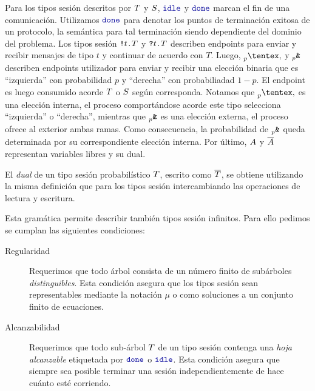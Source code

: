 Para los tipos sesión descritos por $T$ y $S$, $\Idle$
y $\Done$ marcan el fin de una comunicación. Utilizamos $\Done$ para denotar
los puntos de terminación exitosa de un protocolo, la semántica para tal
terminación siendo dependiente del dominio del problema. Los tipos sesión
${\texttt{\upshape!}}{t}\texttt{\upshape.}T$ y ${\texttt{\upshape?}}{t}\texttt{\upshape.}T$ describen endpoints para
enviar y recibir mensajes de tipo $t$ y continuar de acuerdo con $T$. Luego,
$\PChoice$ y
$\PBranch$ describen endpoints utilizador para
enviar y recibir una elección binaria que es ``izquierda'' con probabilidad $p$
y ``derecha'' con probabiliadad $1 - p$. El endpoint es luego consumido acorde
$T$ o $S$ según corresponda. Notamos que $\PChoice{}{}$
es una elección interna, el proceso comportándose acorde este tipo selecciona
``izquierda'' o ``derecha'', mientras que $\PBranch$ es una elección
externa, el proceso ofrece al exterior ambas ramas. Como consecuencia, la
probabilidad de $\PBranch$ queda determinada por su correspondiente
elección interna. Por último, $A$ y $\overline{A}$ representan variables
libres y su dual.

El \emph{dual} de un tipo sesión probabilístico $T$, escrito como
$\overline{T}$, se obtiene utilizando la misma definición que para los
tipos sesión intercambiando las operaciones de lectura y escritura.

Esta gramática permite describir también tipos sesión infinitos. Para ello
pedimos se cumplan las siguientes condiciones:
\begin{description}

	\item[Regularidad] Requerimos que todo árbol consista de un número
		finito de subárboles \emph{distinguibles}. Esta condición
		asegura que los tipos sesión sean representables mediante la
		notación $\mu$ o como soluciones a un
		conjunto finito de ecuaciones.

	\item[Alcanzabilidad] Requerimos que todo sub-árbol $T$ de
		un tipo sesión contenga una \emph{hoja alcanzable} etiquetada
		por $\Done$ o $\Idle$. Esta condición asegura que siempre sea
		posible terminar una sesión independientemente de hace cuánto
		esté corriendo.
\end{description}
